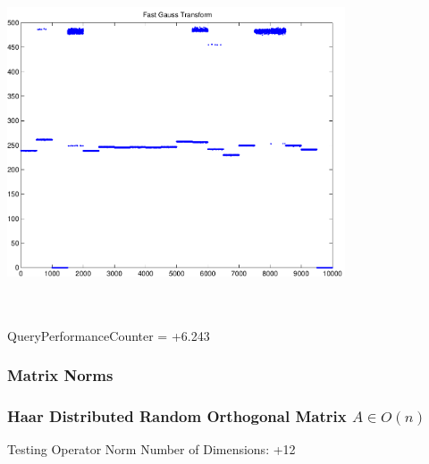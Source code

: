 \documentclass[9pt]{article}
\theoremstyle{plain}
\theoremstyle{definition}
\theoremstyle{remark}
\numberwithin{equation}{section}
\begin{document}
\includegraphics[width=10.0cm,height=10.0cm]{FGT20_Centers.pdf}

QueryPerformanceCounter  =  +6.243
\subsubsection{Matrix Norms}
\subsubsection{Haar Distributed Random Orthogonal Matrix $A \in O(n)$}
 Testing Operator Norm
Number of Dimensions: +12
\end{document}
